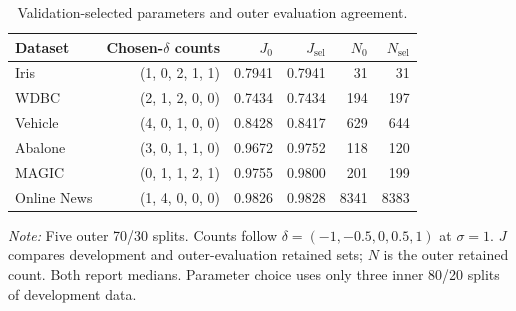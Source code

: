 \begin{table}[t]
\centering\color{red}
\caption{Validation-selected parameters and outer evaluation agreement.}
\label{tab:validation-selection}
\begin{tabular}{lrrrrr}
\toprule
Dataset & Chosen-$\delta$ counts & $J_0$ & $J_{\mathrm{sel}}$ & $N_0$ & $N_{\mathrm{sel}}$ \\
\midrule
Iris & (1, 0, 2, 1, 1) & 0.7941 & 0.7941 & 31 & 31 \\
WDBC & (2, 1, 2, 0, 0) & 0.7434 & 0.7434 & 194 & 197 \\
Vehicle & (4, 0, 1, 0, 0) & 0.8428 & 0.8417 & 629 & 644 \\
Abalone & (3, 0, 1, 1, 0) & 0.9672 & 0.9752 & 118 & 120 \\
MAGIC & (0, 1, 1, 2, 1) & 0.9755 & 0.9800 & 201 & 199 \\
Online News & (1, 4, 0, 0, 0) & 0.9826 & 0.9828 & 8341 & 8383 \\
\bottomrule
\end{tabular}
\par\vspace{0.4ex}\footnotesize\emph{Note:} Five outer 70/30 splits. Counts follow $\delta=(-1,-0.5,0,0.5,1)$ at $\sigma=1$. $J$ compares development and outer-evaluation retained sets; $N$ is the outer retained count. Both report medians. Parameter choice uses only three inner 80/20 splits of development data.
\end{table}
